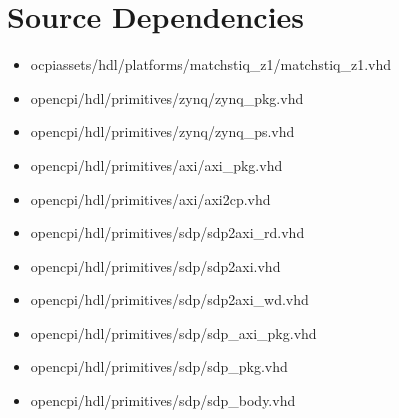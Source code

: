 \documentclass{article}
\begin{document}
\newpage
\section*{Source Dependencies}
\begin{itemize}
	\item
ocpiassets/hdl/platforms/matchstiq\_z1/matchstiq\_z1.vhd
	\item
opencpi/hdl/primitives/zynq/zynq\_pkg.vhd
	\item
opencpi/hdl/primitives/zynq/zynq\_ps.vhd
	\item
opencpi/hdl/primitives/axi/axi\_pkg.vhd
	\item
opencpi/hdl/primitives/axi/axi2cp.vhd
	\item
opencpi/hdl/primitives/sdp/sdp2axi\_rd.vhd
	\item
opencpi/hdl/primitives/sdp/sdp2axi.vhd
	\item
opencpi/hdl/primitives/sdp/sdp2axi\_wd.vhd
	\item
opencpi/hdl/primitives/sdp/sdp\_axi\_pkg.vhd
	\item
opencpi/hdl/primitives/sdp/sdp\_pkg.vhd
	\item
opencpi/hdl/primitives/sdp/sdp\_body.vhd
\end{itemize}
\end{document}
